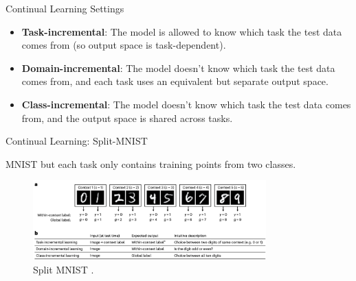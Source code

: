 \documentclass[12pt,aspectratio=169, handout]{beamer}
\let\olditem\item
\renewcommand\item{\olditem\justifying}
\begin{document}
\begin{frame}{Continual Learning Settings}

 \begin{itemize}[<+->]
     \item \textbf{Task-incremental}: The model is allowed to know which task the test data comes from (so output space is task-dependent).
     \item \textbf{Domain-incremental}: The model doesn't know which task the test data comes from, and each task uses an equivalent but separate output space.
     \item \textbf{Class-incremental}: The model doesn't know which task the test data comes from, and the output space is shared across tasks.
 \end{itemize}

\end{frame}

\begin{frame}{Continual Learning: Split-MNIST}

MNIST but each task only contains training points from two classes.

\begin{figure}
    \centering
        \includegraphics[width=0.8\textwidth]{"images/split_mnist.png"}
        \caption{Split MNIST \parencite{van_de_ven_three_2022}.}
\end{figure}
\end{frame}
\end{document}
